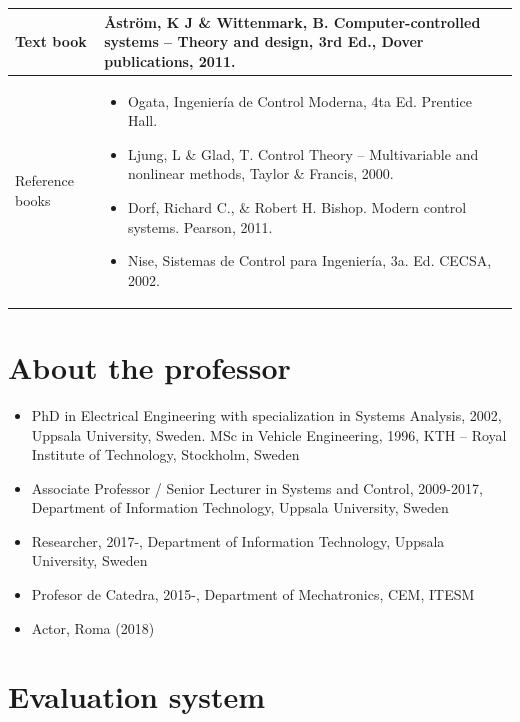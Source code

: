 \documentclass[letter, 10pt]{scrartcl}
\begin{document}
\begin{tabularx}{\linewidth}{|L|X|}
\hline
Text book
& Åström, K J \& Wittenmark, B. Computer-controlled systems – Theory and design, 3rd Ed., Dover publications, 2011.\\
\hline
Reference books
& 
\begin{minipage}[t]{\linewidth}
\begin{itemize}[noitemsep] 
\item Ogata, Ingeniería de Control Moderna, 4ta Ed. Prentice Hall.
\item Ljung, L \& Glad, T. Control Theory – Multivariable and nonlinear methods, Taylor \& Francis, 2000.
\item Dorf, Richard C., \& Robert H. Bishop. Modern control systems. Pearson, 2011.
\item Nise, Sistemas de Control para Ingeniería, 3a. Ed. CECSA, 2002.
\end{itemize}
  \end{minipage} \\\hline
\end{tabularx}

\section*{About the professor}
\begin{itemize}[noitemsep]
\item PhD in Electrical Engineering with specialization in Systems Analysis, 2002, Uppsala University, Sweden. MSc in Vehicle Engineering, 1996, KTH -- Royal Institute of Technology, Stockholm, Sweden
\item Associate Professor / Senior Lecturer in Systems and Control, 2009-2017, Department of Information Technology, Uppsala University, Sweden
\item Researcher, 2017-, Department of Information Technology, Uppsala University, Sweden
\item Profesor de Catedra, 2015-,  Department of Mechatronics, CEM, ITESM
\item Actor, Roma (2018)
\end{itemize}

\section*{Evaluation system}

\end{document}
